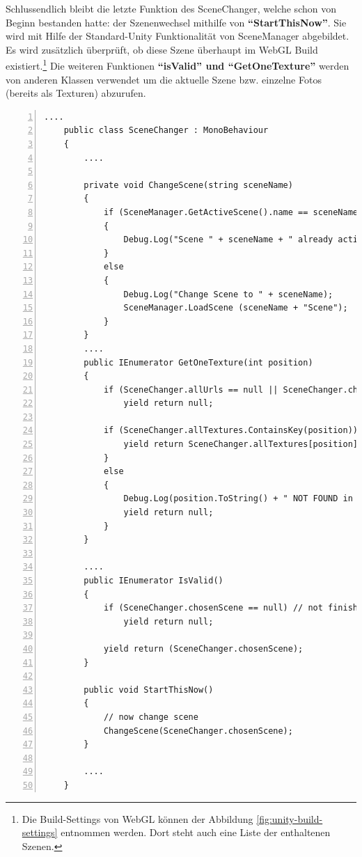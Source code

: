 Schlussendlich bleibt die letzte Funktion des SceneChanger, welche schon von Beginn bestanden hatte: der Szenenwechsel mithilfe von \textbf{``StartThisNow''}. Sie wird mit Hilfe der Standard-Unity Funktionalität von SceneManager abgebildet. Es wird zusätzlich überprüft, ob diese Szene überhaupt im WebGL Build existiert.\footnote{Die Build-Settings von WebGL können der Abbildung \ref{fig:unity-build-settings} entnommen werden. Dort steht auch eine Liste der enthaltenen Szenen.} Die weiteren Funktionen \textbf{``isValid'' und ``GetOneTexture''} werden von anderen Klassen verwendet um die aktuelle Szene bzw. einzelne Fotos (bereits als Texturen) abzurufen.


\begin{lstlisting}[numbers=left,caption={SceneChanger},label={lst:unity-scene-changer-public}]
....
    public class SceneChanger : MonoBehaviour
    {
        ....
        
        private void ChangeScene(string sceneName)
        {
            if (SceneManager.GetActiveScene().name == sceneName + "Scene" || (sceneName == "ERROR"))
            {
                Debug.Log("Scene " + sceneName + " already active!");
            }
            else 
            {
                Debug.Log("Change Scene to " + sceneName);
                SceneManager.LoadScene (sceneName + "Scene");
            }
        }
        ....
        public IEnumerator GetOneTexture(int position)
        {
            if (SceneChanger.allUrls == null || SceneChanger.chosenScene == null) // not finished call to backend
                yield return null;
                
            if (SceneChanger.allTextures.ContainsKey(position)) {
                yield return SceneChanger.allTextures[position];
            }
            else 
            {
                Debug.Log(position.ToString() + " NOT FOUND in MemoryLand!");
                yield return null;
            }
        }
    
        ....    
        public IEnumerator IsValid()
        {
            if (SceneChanger.chosenScene == null) // not finished call to backend
                yield return null;
                
            yield return (SceneChanger.chosenScene);
        }
    
        public void StartThisNow()
        {
            // now change scene
            ChangeScene(SceneChanger.chosenScene);
        }
    
        ....
    }
\end{lstlisting}

